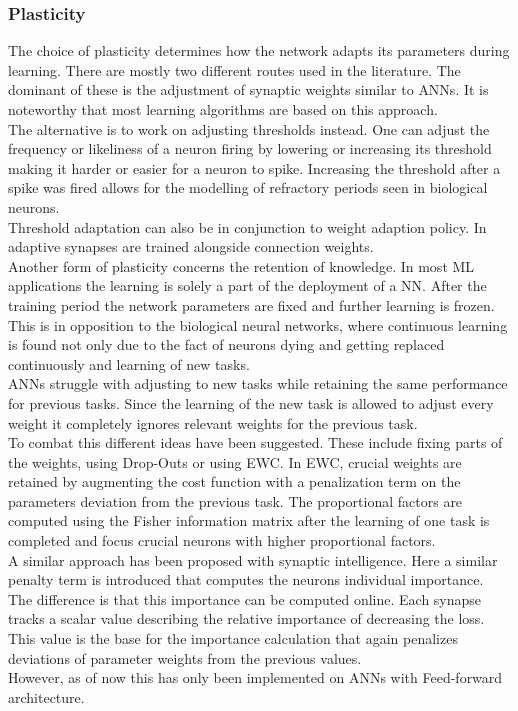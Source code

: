 \subsubsection{Plasticity}
	The choice of plasticity determines how the network adapts its parameters during learning. There are mostly two different routes used in the literature. The dominant of these is the adjustment of synaptic weights similar to \acp{ANN}. It is noteworthy that most learning algorithms are based on this approach.\\
	The alternative is to work on adjusting thresholds instead\cite{chen_adaptive_2022,amin_automated_2021}. One can adjust the frequency or likeliness of a neuron firing by lowering or increasing its threshold making it harder or easier for a neuron to spike. Increasing the threshold after a spike was fired allows for the modelling of refractory periods seen in biological neurons.\\
	Threshold adaptation can also be in conjunction to weight adaption policy. In \cite{sun_synapse-threshold_2023} adaptive synapses are trained alongside connection weights.\\
	Another form of plasticity concerns the retention of knowledge. In most \ac{ML} applications the learning is solely a part of the deployment of a \ac{NN}. After the training period the network parameters are fixed and further learning is frozen. This is in opposition to the biological neural networks, where continuous learning is found not only due to the fact of neurons dying and getting replaced continuously and learning of new tasks.\\
	\acp{ANN} struggle with adjusting to new tasks while retaining the same performance for previous tasks. Since the learning of the new task is allowed to adjust every weight it completely ignores relevant weights for the previous task.\\
	To combat this different ideas have been suggested. These include fixing parts of the weights, using Drop-Outs or using \ac{EWC}\cite{kirkpatrick_overcoming_2017}. In \ac{EWC}, crucial weights are retained by augmenting the cost function with a penalization term on the parameters deviation from the previous task. The proportional factors are computed using the Fisher information matrix after the learning of one task is completed and focus crucial neurons with higher proportional factors.\\
	A similar approach has been proposed with synaptic intelligence\cite{zenke_continual_2017}.
	Here a similar penalty term is introduced that computes the neurons individual importance. The difference is that this importance can be computed online. Each synapse tracks a scalar value describing the relative importance of decreasing the loss. This value is the base for the importance calculation that again penalizes deviations of parameter weights from the previous values.\\
	However, as of now this has only been implemented on \acp{ANN} with Feed-forward architecture.


